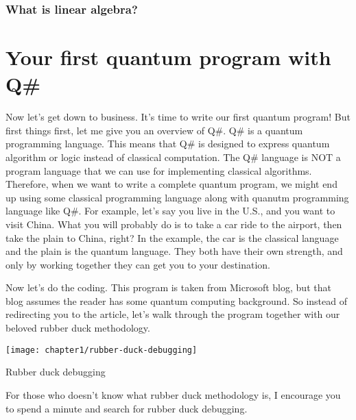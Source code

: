 \subsubsection{\textbf{What} is linear algebra?}

\section{Your first quantum program with Q\#}

\begin{fullwidth}

Now let's get down to business. It's time to write our first quantum program!
But first things first, let me give you an overview of Q\#.
Q\# is a quantum programming language.
This means that Q\# is designed to express quantum algorithm or logic instead of classical computation.
The Q\# language is NOT a program language that we can use for implementing classical algorithms.
Therefore, when we want to write a complete quantum program, we might end up using some classical programming language along with quanutm programming language like Q\#.
For example, let's say you live in the U.S., and you want to visit China.
What you will probably do is to take a car ride to the airport, then take the plain to China, right?
In the example, the car is the classical language and the plain is the quantum language.
They both have their own strength, and only by working together they can get you to your destination.

\end{fullwidth}


Now let's do the coding.
This program is taken from Microsoft blog\cite{Chapter1-first-quantum-program}, but that blog assumes the reader has some quantum computing background.
So instead of redirecting you to the article, let's walk through the program together with our beloved rubber duck methodology\cite{Chapter1-rubber-duck}.

\begin{marginfigure}[\baselineskip]
    \texttt{[image: chapter1/rubber-duck-debugging]}
    \caption{Rubber duck debugging}
    \label{fig:chapter1-rubber-duck-picture}
\end{marginfigure}

For those who doesn't know what rubber duck methodology is, I encourage you to spend a minute and search for rubber duck debugging\cite{Chapter1-rubber-duck-picture}.

